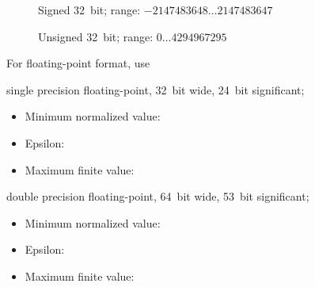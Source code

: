 \begin{codelist}
\begin{description}
  \item[]\itemend
    Signed 32~bit; range: $-2147483648\dots2147483647$

  \item[]\itemend
    Unsigned 32~bit; range: $0\dots4294967295$
  \end{description}

  For floating-point format, use

  \begin{description}
  \item[\itempar{\code{r32} \\ \code{real32} \\ \code{float}}]\itemend
     single precision floating-point, 32~bit wide, 24~bit significant;

    \begin{itemize}
    \item
      Minimum normalized value: 
    \item
      Epsilon: 
    \item
      Maximum finite value: 
    \end{itemize}

  \item[\itempar{\code{r64} \\ \code{real64} \\ \code{double}}]\itemend
     double precision floating-point, 64~bit wide, 53~bit significant;

    \begin{itemize}
    \item
      Minimum normalized value: 
    \item
      Epsilon: 
    \item
      Maximum finite value: 
    \end{itemize}
  \end{description}


\end{codelist}
